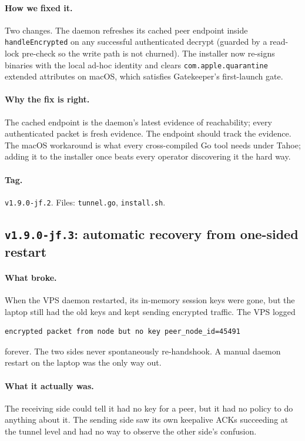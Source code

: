\documentclass[11pt,a4paper]{article}
\begin{document}
\paragraph{How we fixed it.} Two changes. The daemon refreshes
its cached peer endpoint inside \texttt{handleEncrypted} on any
successful authenticated decrypt (guarded by a read-lock
pre-check so the write path is not churned). The installer now
re-signs binaries with the local ad-hoc identity and clears
\texttt{com.apple.quarantine} extended attributes on macOS,
which satisfies Gatekeeper's first-launch gate.

\paragraph{Why the fix is right.} The cached endpoint is the
daemon's latest evidence of reachability; every authenticated
packet is fresh evidence. The endpoint should track the evidence.
The macOS workaround is what every cross-compiled Go tool needs
under Tahoe; adding it to the installer once beats every
operator discovering it the hard way.

\paragraph*{Tag.} \texttt{v1.9.0-jf.2}. Files: \texttt{tunnel.go},
\texttt{install.sh}.

\subsection{\texttt{v1.9.0-jf.3}: automatic recovery from
one-sided restart}

\paragraph{What broke.} When the VPS daemon restarted, its
in-memory session keys were gone, but the laptop still had the
old keys and kept sending encrypted traffic. The VPS logged
\begin{lstlisting}
encrypted packet from node but no key peer_node_id=45491
\end{lstlisting}
forever. The two sides never spontaneously re-handshook. A
manual daemon restart on the laptop was the only way out.

\paragraph{What it actually was.} The receiving side could tell
it had no key for a peer, but it had no policy to do anything
about it. The sending side saw its own keepalive ACKs succeeding
at the tunnel level and had no way to observe the other side's
confusion.
\end{document}
